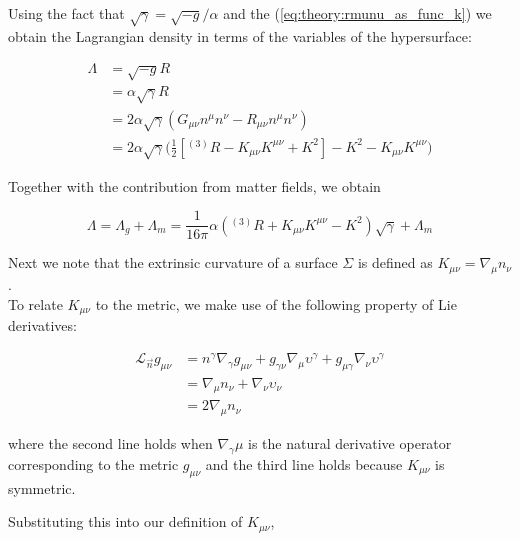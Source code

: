 \documentclass[11pt,a4paper,headinclude=true,DIV=14,BCOR=8mm,chapterprefix,listof=totoc,twoside,openright,abstracton]{scrbook}
\begin{document}
Using the fact that $\sqrt{\gamma}=\sqrt{-g}/\alpha$ and the (\ref{eq:theory:rmunu_as_func_k}) we obtain the Lagrangian density in terms of the variables of the hypersurface:

\begin{align}
    \Lambda &= \sqrt{-g}R \\
    &= \alpha\sqrt{\gamma}R \\
    &= 2\alpha\sqrt{\gamma}(G_{\mu\nu}n^{\mu}n^{\nu} - R_{\mu\nu}n^{\mu}n^{\nu})\\ 
    &= 2\alpha\sqrt{\gamma}\Big(\frac{1}{2}[{^{(3)}R} - K_{\mu\nu}K^{\mu\nu} + K^2] - K^2 - K_{\mu\nu}K^{\mu\nu}\Big)
\end{align}

Together with the contribution from matter fields, we obtain

\begin{equation}
    \Lambda = \Lambda_g+\Lambda_m= \frac{1}{16\pi}\alpha({^{(3)}R} + K_{\mu\nu}K^{\mu\nu} - K^2)\sqrt{\gamma}+\Lambda_m
\end{equation}

Next we note that the extrinsic curvature of a
surface $\Sigma$ is defined as $K_{\mu\nu} = \nabla_{\mu}n_{\nu}$. \\
To relate $K_{\mu\nu}$ to the metric, we make use of the following property of Lie derivatives:

\begin{align}
    \mathcal{L}_{\vec{n}}g_{\mu\nu} &= n^{\gamma}\nabla_{\gamma}g_{\mu\nu} + g_{\gamma\nu}\nabla_{\mu}\upsilon^{\gamma} + g_{\mu\gamma}\nabla_{\nu}\upsilon^{\gamma} \\
    &= \nabla_{\mu}n_{\nu}+\nabla_{\nu}\upsilon_{\nu} \\
    &=2\nabla_{\mu}n_{\nu}
\end{align}

where the second line holds when $\nabla_{\gamma}\mu$ is the natural derivative operator corresponding to the metric $g_{\mu\nu}$ and the third line holds because $K_{\mu\nu}$ is symmetric.

Substituting this into our definition of $K_{\mu\nu}$,
\end{document}
